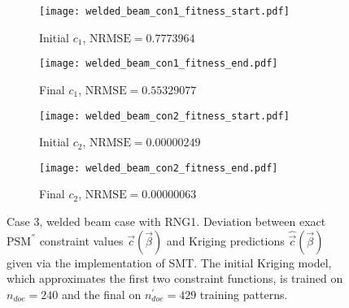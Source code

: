 \begin{figure}[h!]
\centering
    \begin{subfigure}[b]{0.45\textwidth}
    \centering
    \caption{Initial $c_{1}$, $\mathrm{NRMSE} \!= \!0.7773964$}
    \texttt{[image: welded\_beam\_con1\_fitness\_start.pdf]}    
    \end{subfigure}
    \hfill
    \begin{subfigure}[b]{0.45\textwidth}
    \centering
    \caption{Final $c_{1}$, $\mathrm{NRMSE} \!= \!0.55329077$}
    \texttt{[image: welded\_beam\_con1\_fitness\_end.pdf]}    
    \end{subfigure}
    \hfill
    \begin{subfigure}[b]{0.45\textwidth}
    \centering
    \caption{Initial $c_{2}$, $\mathrm{NRMSE} \!= \!0.00000249$}
    \texttt{[image: welded\_beam\_con2\_fitness\_start.pdf]}    
    \end{subfigure}
    \hfill
    \begin{subfigure}[b]{0.45\textwidth}
    \centering
    \caption{Final $c_{2}$, $\mathrm{NRMSE} \!= \!0.00000063$}
    \texttt{[image: welded\_beam\_con2\_fitness\_end.pdf]}    
    \end{subfigure}
\caption{Case 3, welded beam case with RNG1. Deviation between 
exact $\mathrm{PSM}^{''}$ constraint values $\vec{c}(\vec{β})$ and 
Kriging predictions $\hat{\vec{c}}(\vec{β})$ given via the 
implementation of SMT. The initial Kriging model, which 
approximates the first two constraint functions, is trained on 
$n_{doe} \!= \!240$ and the final on $n_{doe}^{'} \!= \!429$ 
training patterns.}
\label{fig:fitting_con1_2_welded_beam}
\end{figure}

\newpage

